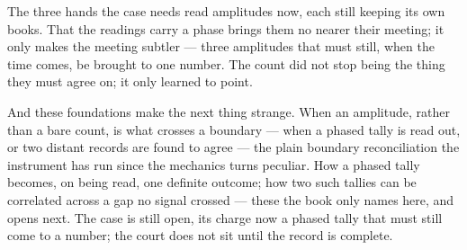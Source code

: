 The three hands the case needs read amplitudes now, each still keeping its own books. That the readings carry a
phase brings them no nearer their meeting; it only makes the meeting subtler --- three amplitudes that must
still, when the time comes, be brought to one number. The count did not stop being the thing they must agree
on; it only learned to point.

And these foundations make the next thing strange. When an amplitude, rather than a bare count, is what crosses
a boundary --- when a phased tally is read out, or two distant records are found to agree --- the plain boundary
reconciliation the instrument has run since the mechanics turns peculiar. How a phased tally becomes, on being
read, one definite outcome; how two such tallies can be correlated across a gap no signal crossed --- these the
book only names here, and opens next. The case is still open, its charge now a phased tally that must still come
to a number; the court does not sit until the record is complete.

